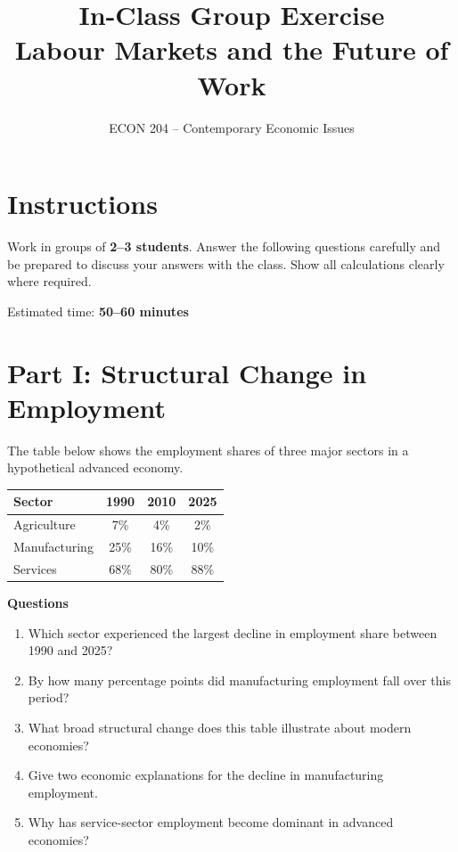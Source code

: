 \documentclass[12pt]{article}
\title{\textbf{In-Class Group Exercise}\\
Labour Markets and the Future of Work}
\author{ECON 204 -- Contemporary Economic Issues}
\date{}
\begin{document}
\maketitle

\section*{Instructions}

Work in groups of \textbf{2--3 students}. Answer the following questions carefully and be prepared to discuss your answers with the class. Show all calculations clearly where required.

Estimated time: \textbf{50--60 minutes}

\vspace{1em}

\section*{Part I: Structural Change in Employment}

The table below shows the employment shares of three major sectors in a hypothetical advanced economy.

\begin{center}
\begin{tabular}{lccc}
\toprule
Sector & 1990 & 2010 & 2025 \\
\midrule
Agriculture & 7\% & 4\% & 2\% \\
Manufacturing & 25\% & 16\% & 10\% \\
Services & 68\% & 80\% & 88\% \\
\bottomrule
\end{tabular}
\end{center}

\textbf{Questions}

\begin{enumerate}[label=\arabic*.]
\item Which sector experienced the largest decline in employment share between 1990 and 2025?
\vspace{1.5cm}

\item By how many percentage points did manufacturing employment fall over this period?
\vspace{1.5cm}

\item What broad structural change does this table illustrate about modern economies?
\vspace{2cm}

\item Give two economic explanations for the decline in manufacturing employment.
\vspace{2.5cm}

\item Why has service-sector employment become dominant in advanced economies?
\vspace{2.5cm}
\end{enumerate}
\end{document}
